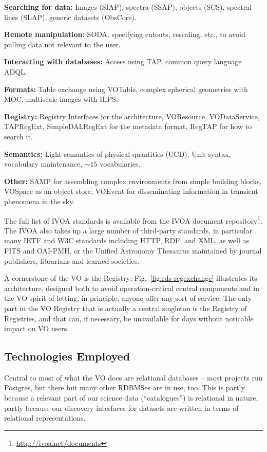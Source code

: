 \textbf{Searching for data:} Images (SIAP), spectra (SSAP), objects
(SCS), spectral lines (SLAP), generic datasets (ObsCore).

\textbf{Remote manipulation:} SODA, specifying cutouts, rescaling, etc.,
to avoid pulling data not relevant to the user.

\textbf{Interacting with databases:} Access using TAP, common query
language ADQL.

\textbf{Formats:} Table exchange using VOTable, complex spherical
geometries with MOC, multiscale images with HiPS.

\textbf{Registry:} Registry Interfaces for the architecture, VOResource,
VODataService, TAPRegExt, SimpleDALRegExt for the metadata format,
RegTAP for how to search it.

\textbf{Semantics:} Light semantics of physical quantities (UCD), Unit
syntax, vocabulary maintenance, $\sim 15$ vocabularies.

\textbf{Other:} SAMP for assembling complex environments from simple
building blocks, VOSpace as an object store, VOEvent for disseminating
information in transient phenomena in the sky.

The full list of IVOA standards is available from the IVOA document
repository\footnote{\url{http://ivoa.net/documents}}.  The IVOA also
takes up a large number of third-party standards, in particular many
IETF and W3C standards including HTTP, RDF, and XML, as well as FITS and
OAI-PMH, or the Unified Astronomy Thesaurus maintained by journal
publishers, librarians and learned societies.

A cornerstone of the VO is the Registry; Fig.~\ref{fig:rds-regexchange}
illustrates its architecture, designed both to avoid operation-critical
central components and in the VO spirit of letting, in principle,
anyone offer any sort of service.  The only part in the VO Registry that
is actually a central singleton is the Registry of Registries, and that
can, if necessary, be unavailable for days without noticable impact on
VO users.

\subsection{Technologies Employed}

Central to most of what the VO does are relational databases -- most
projects run Postgres, but there but many other RDBMSes are in use, too.
This is partly because a relevant part of our science data
(``catalogues'') is relational in nature, partly because our discovery
interfaces for datasets are written in terms of relational
representations.

